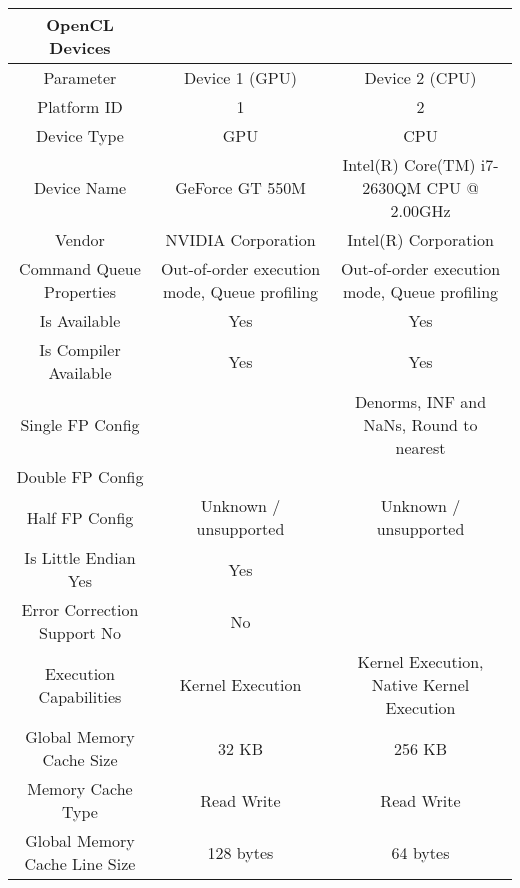 
\begin{tabular}{|c|c|c|}
\hline 
OpenCL Devices & & \\
\hline 
Parameter         &                Device 1 (GPU)             &       Device 2 (CPU) \\ 
\hline                    
Platform ID       &                1                         &        2                        \\
Device Type          &             GPU                  &             CPU                               \\
Device Name                 &      GeForce GT 550M                        & Intel(R) Core(TM) i7-2630QM CPU @ 2.00GHz \\
Vendor                  &          NVIDIA Corporation               & Intel(R) Corporation              \\
Command Queue Properties   &       Out-of-order execution mode, Queue profiling &Out-of-order execution mode, Queue profiling \\
Is Available                &      Yes            &                   Yes                               \\
Is Compiler Available       &      Yes          &                     Yes                               \\
Single FP Config         &         & Denorms, INF and NaNs, Round to nearest \\
Double FP Config          &       &  \\
Half FP Config         &          Unknown / unsupported    &         Unknown / unsupported     \\        
Is Little Endian                  Yes                  &             Yes                               \\
Error Correction Support          No                   &             No                                \\
Execution Capabilities          &  Kernel Execution      &            Kernel Execution, Native Kernel Execution \\
Global Memory Cache Size    &      32 KB                &             256 KB              \\              
Memory Cache Type        &         Read Write          &              Read Write                        \\
Global Memory Cache Line Size &    128 bytes         &                64 bytes             \\             

\end{tabular}
